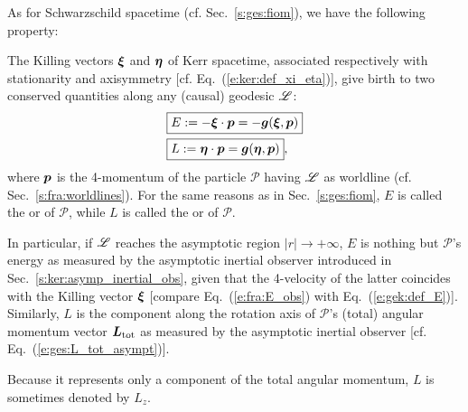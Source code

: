 As for Schwarzschild spacetime (cf. Sec.~\ref{s:ges:fiom}), we have the following
property:
\begin{prop}
\label{p:gek:conserved_E_L}
The Killing vectors $\bm{\xi}$ and $\bm{\eta}$ of Kerr spacetime,
associated respectively with
stationarity and axisymmetry [cf. Eq.~(\ref{e:ker:def_xi_eta})],
give birth to two conserved quantities
along any (causal) geodesic $\mathscr{L}$:
\begin{subequations}
\label{e:gek:def_E_L}
\begin{align}
& \fbox{$\displaystyle E := - \bm{\xi}\cdot \bm{p} = - \bm{g}(\bm{\xi},\bm{p}) $} \label{e:gek:def_E} \\
& \fbox{$\displaystyle L := \bm{\eta}\cdot \bm{p} = \bm{g}(\bm{\eta},\bm{p}) $} , \label{e:gek:def_L}
\end{align}
\end{subequations}
where $\bm{p}$ is the 4-momentum of the particle $\mathscr{P}$
having $\mathscr{L}$ as worldline (cf. Sec.~\ref{s:fra:worldlines}).
For the same reasons as in Sec.~\ref{s:ges:fiom}, $E$ is called
the 
or  of $\mathscr{P}$,
while $L$ is called the 
or 
of $\mathscr{P}$.
\end{prop}
In particular, if $\mathscr{L}$ reaches the asymptotic region $|r|\to+\infty$,
$E$ is nothing but $\mathscr{P}$'s energy as measured by the asymptotic inertial
observer introduced in Sec.~\ref{s:ker:asymp_inertial_obs}, given that
the 4-velocity of the latter coincides with the Killing vector
$\bm{\xi}$
[compare Eq.~(\ref{e:fra:E_obs}) with Eq.~(\ref{e:gek:def_E})].
Similarly, $L$ is the component along the rotation axis of $\mathscr{P}$'s (total) angular momentum vector $\bm{L}_{\rm tot}$
as measured by the asymptotic inertial observer [cf. Eq.~(\ref{e:ges:L_tot_asympt})].

\begin{remark}
Because it represents only a component of the total angular momentum,
$L$ is sometimes denoted by $L_z$.
\end{remark}

